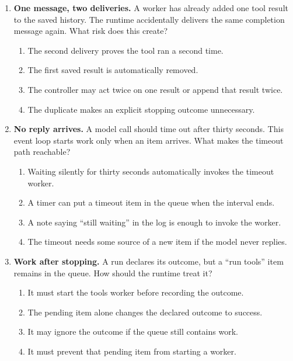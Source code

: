 \begin{enumerate}[start=41,itemsep=0.7\baselineskip]
\item\label{exercise:46} \begin{minipage}[t]{\linewidth}
\textbf{One message, two deliveries.} A worker has already added one tool result to the saved history. The runtime accidentally delivers the same completion message again. What risk does this create?
\begin{enumerate}[label=\textnormal{(\Alph*)},leftmargin=*,itemsep=0pt]
\item The second delivery proves the tool ran a second time.
\item The first saved result is automatically removed.
\item The controller may act twice on one result or append that result twice.
\item The duplicate makes an explicit stopping outcome unnecessary.
\end{enumerate}
\end{minipage}

\item\label{exercise:47} \begin{minipage}[t]{\linewidth}
\textbf{No reply arrives.} A model call should time out after thirty seconds. This event loop starts work only when an item arrives. What makes the timeout path reachable?
\begin{enumerate}[label=\textnormal{(\Alph*)},leftmargin=*,itemsep=0pt]
\item Waiting silently for thirty seconds automatically invokes the timeout worker.
\item A timer can put a timeout item in the queue when the interval ends.
\item A note saying ``still waiting'' in the log is enough to invoke the worker.
\item The timeout needs some source of a new item if the model never replies.
\end{enumerate}
\end{minipage}

\item\label{exercise:48} \begin{minipage}[t]{\linewidth}
\textbf{Work after stopping.} A run declares its outcome, but a ``run tools'' item remains in the queue. How should the runtime treat it?
\begin{enumerate}[label=\textnormal{(\Alph*)},leftmargin=*,itemsep=0pt]
\item It must start the tools worker before recording the outcome.
\item The pending item alone changes the declared outcome to success.
\item It may ignore the outcome if the queue still contains work.
\item It must prevent that pending item from starting a worker.
\end{enumerate}
\end{minipage}


\end{enumerate}
